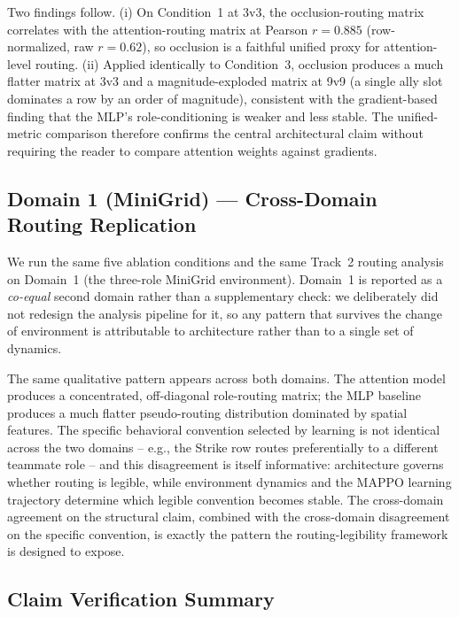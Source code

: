 Two findings follow. (i) On Condition~1 at 3v3, the occlusion-routing matrix correlates with the attention-routing matrix at Pearson $r{=}0.885$ (row-normalized, raw $r{=}0.62$), so occlusion is a faithful unified proxy for attention-level routing. (ii) Applied identically to Condition~3, occlusion produces a much flatter matrix at 3v3 and a magnitude-exploded matrix at 9v9 (a single ally slot dominates a row by an order of magnitude), consistent with the gradient-based finding that the MLP's role-conditioning is weaker and less stable. The unified-metric comparison therefore confirms the central architectural claim without requiring the reader to compare attention weights against gradients.

\subsection{Domain 1 (MiniGrid) --- Cross-Domain Routing Replication}
\label{sec:domain1}

We run the same five ablation conditions and the same Track~2 routing analysis on Domain~1 (the three-role MiniGrid environment). Domain~1 is reported as a \emph{co-equal} second domain rather than a supplementary check: we deliberately did not redesign the analysis pipeline for it, so any pattern that survives the change of environment is attributable to architecture rather than to a single set of dynamics.

The same qualitative pattern appears across both domains. The attention model produces a concentrated, off-diagonal role-routing matrix; the MLP baseline produces a much flatter pseudo-routing distribution dominated by spatial features. The specific behavioral convention selected by learning is not identical across the two domains -- e.g., the Strike row routes preferentially to a different teammate role -- and this disagreement is itself informative: architecture governs whether routing is legible, while environment dynamics and the MAPPO learning trajectory determine which legible convention becomes stable. The cross-domain agreement on the structural claim, combined with the cross-domain disagreement on the specific convention, is exactly the pattern the routing-legibility framework is designed to expose.

\subsection{Claim Verification Summary}

